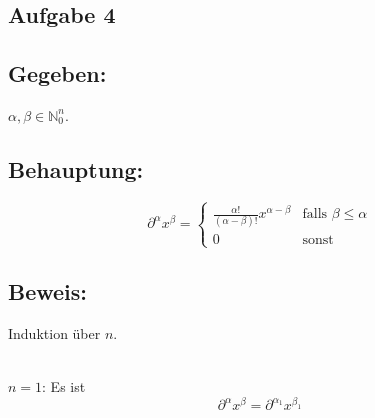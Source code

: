 \documentclass[a4paper, 12pt]{article} %
\begin{document}
\begin{flushleft}
    \QEDB

    \section*{Aufgabe 4}

    \subsection*{Gegeben:}
    $\alpha, \beta \in \mathbb{N}^n_0$.

    \subsection*{Behauptung:}
    $$
        \partial^\alpha x^\beta = \begin{cases}
            \frac{\alpha !}{(\alpha - \beta)!} x^{\alpha - \beta} & \text{falls } \beta \le \alpha \\
            0                                                     & \text{sonst}
        \end{cases}
    $$

    \subsection*{Beweis:}
    Induktion über $n$.

    \hfill\\

    $n=1$: Es ist
    $$
        \partial^\alpha x^\beta = \partial^{\alpha_1} x^{\beta_1}
    $$


\end{flushleft}
\end{document}
